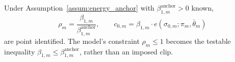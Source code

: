 \label{prop:anchored_identification}
Under Assumption~\ref{assum:energy_anchor} with $\beta_{1,m}^{\mathrm{anchor}}>0$ known,
\begin{equation}
    \rho_m=\frac{\beta_{1,m}}{\beta_{1,m}^{\mathrm{anchor}}}, \qquad
    c_{0,m}=\beta_{1,m}\cdot e(\sigma_{0,m};\pi_m,\bar\theta_m)
    \label{eq:anchored_estimator}
\end{equation}
are point identified. The model's constraint $\rho_m\le1$ becomes the testable inequality
$\beta_{1,m}\le\beta_{1,m}^{\mathrm{anchor}}$, rather than an imposed clip.
